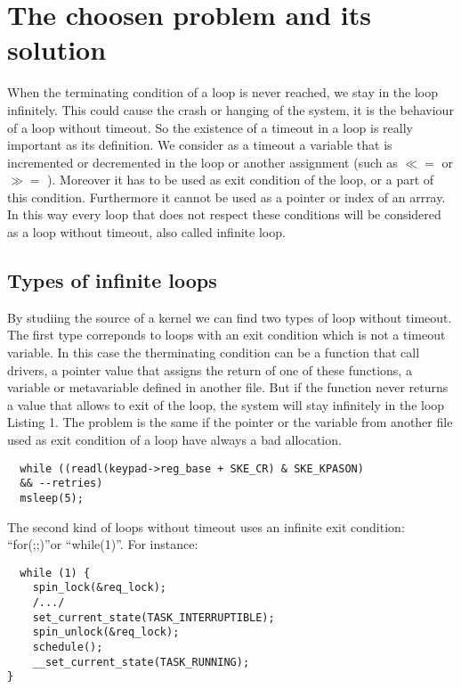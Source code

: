 \documentclass[a4paper,12pt]{article}
\begin{document}
\section{The choosen problem and its solution}

When the terminating condition of a loop is never reached, we stay in the loop infinitely. This could cause the crash or hanging of the system, it is the behaviour of a loop without timeout. So the existence of a timeout in a loop is really important as its definition. We consider as a timeout a variable that is incremented or decremented in the loop or another assignment (such as $ \ll= $ or $ \gg= $ ). Moreover it has to be used as  exit condition of the loop, or a part of this condition. Furthermore it cannot be used as a pointer or index of an arrray. In this way every loop that does not respect these conditions will be considered as a loop without timeout, also called infinite loop.


\subsection{Types of infinite loops}
By studiing the source of a kernel we can find two types of loop without timeout. The first type correponds to loops with an exit condition which is not a timeout variable. In this case the therminating condition can be a function that call drivers, a pointer value that assigns the return of one of these functions, a variable or metavariable defined in another file. But if the function never returns a value that allows to exit of the loop, the system will stay infinitely in the loop Listing 1. The problem is the same if the pointer or the variable from another file used as exit condition of a loop have always a bad allocation.

\begin{lstlisting}
  while ((readl(keypad->reg_base + SKE_CR) & SKE_KPASON) 
  && --retries)
  msleep(5);
\end{lstlisting}

\vspace{0.5cm}
The second kind of loops without timeout uses an infinite exit condition: ``for(;;)''or ``while(1)''. For instance:
\begin{lstlisting}
  while (1) {
    spin_lock(&req_lock);
    /.../
    set_current_state(TASK_INTERRUPTIBLE);
    spin_unlock(&req_lock);
    schedule();
    __set_current_state(TASK_RUNNING);
}
\end{lstlisting}
\end{document}
